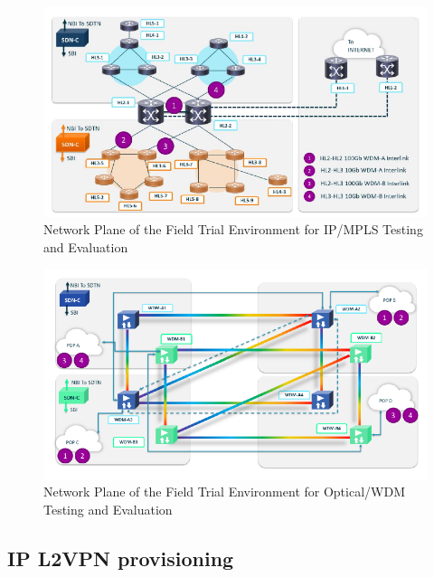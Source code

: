 \documentclass[a4paper,fleqn]{cas-dc}
\begin{document}

\begin{figure}
	\centering
		\includegraphics[scale=1]{figs/field_trial_environment_ip.pdf}
	\caption{Network Plane of the Field Trial Environment for IP/MPLS Testing and Evaluation}
	\label{FIG:field_trial_ip}
\end{figure}

\begin{figure}
	\centering
		\includegraphics[scale=1]{figs/field_trial_environment_optical.pdf}
	\caption{Network Plane of the Field Trial Environment for Optical/WDM Testing and Evaluation}
	\label{FIG:field_trial_optical}
\end{figure}

\subsection{IP L2VPN provisioning}
\label{section:single-l2nm}
\end{document}
